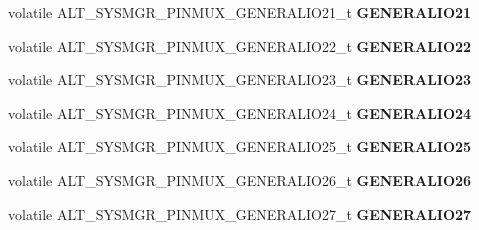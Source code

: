 \begin{DoxyCompactItemize}
\item 
\mbox{\label{structALT__SYSMGR__PINMUX__s_ab0ea1c8cfd4bb7424b5f9b113c887d04}} 
volatile A\+L\+T\+\_\+\+S\+Y\+S\+M\+G\+R\+\_\+\+P\+I\+N\+M\+U\+X\+\_\+\+G\+E\+N\+E\+R\+A\+L\+I\+O21\+\_\+t {\bfseries G\+E\+N\+E\+R\+A\+L\+I\+O21}
\item 
\mbox{\label{structALT__SYSMGR__PINMUX__s_a994514a0bb87f1652a6f2aa38d003e7b}} 
volatile A\+L\+T\+\_\+\+S\+Y\+S\+M\+G\+R\+\_\+\+P\+I\+N\+M\+U\+X\+\_\+\+G\+E\+N\+E\+R\+A\+L\+I\+O22\+\_\+t {\bfseries G\+E\+N\+E\+R\+A\+L\+I\+O22}
\item 
\mbox{\label{structALT__SYSMGR__PINMUX__s_addc2ccd3d44d71ffa00d68c804215644}} 
volatile A\+L\+T\+\_\+\+S\+Y\+S\+M\+G\+R\+\_\+\+P\+I\+N\+M\+U\+X\+\_\+\+G\+E\+N\+E\+R\+A\+L\+I\+O23\+\_\+t {\bfseries G\+E\+N\+E\+R\+A\+L\+I\+O23}
\item 
\mbox{\label{structALT__SYSMGR__PINMUX__s_a57eeb118df50a671543cf7811bfa880b}} 
volatile A\+L\+T\+\_\+\+S\+Y\+S\+M\+G\+R\+\_\+\+P\+I\+N\+M\+U\+X\+\_\+\+G\+E\+N\+E\+R\+A\+L\+I\+O24\+\_\+t {\bfseries G\+E\+N\+E\+R\+A\+L\+I\+O24}
\item 
\mbox{\label{structALT__SYSMGR__PINMUX__s_a27f38488fecabde5a60516c966246ab2}} 
volatile A\+L\+T\+\_\+\+S\+Y\+S\+M\+G\+R\+\_\+\+P\+I\+N\+M\+U\+X\+\_\+\+G\+E\+N\+E\+R\+A\+L\+I\+O25\+\_\+t {\bfseries G\+E\+N\+E\+R\+A\+L\+I\+O25}
\item 
\mbox{\label{structALT__SYSMGR__PINMUX__s_a9e7d792ed9f6203f3fd78a81cbdb0573}} 
volatile A\+L\+T\+\_\+\+S\+Y\+S\+M\+G\+R\+\_\+\+P\+I\+N\+M\+U\+X\+\_\+\+G\+E\+N\+E\+R\+A\+L\+I\+O26\+\_\+t {\bfseries G\+E\+N\+E\+R\+A\+L\+I\+O26}
\item 
\mbox{\label{structALT__SYSMGR__PINMUX__s_a44355952e94663970b0faae917646b65}} 
volatile A\+L\+T\+\_\+\+S\+Y\+S\+M\+G\+R\+\_\+\+P\+I\+N\+M\+U\+X\+\_\+\+G\+E\+N\+E\+R\+A\+L\+I\+O27\+\_\+t {\bfseries G\+E\+N\+E\+R\+A\+L\+I\+O27}
\item 
\mbox{\label{structALT__SYSMGR__PINMUX__s_a9697be7bb91167e4feb26a703c5d6357}} 

\end{DoxyCompactItemize}

